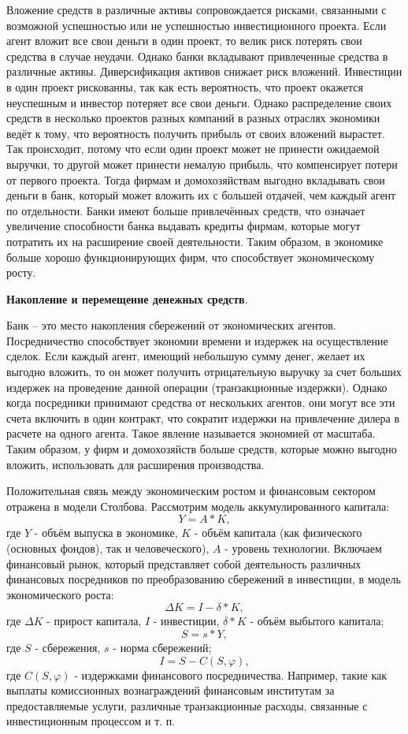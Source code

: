 \begin{Enumerate}
	Вложение средств в различные активы сопровождается рисками, связанными с возможной успешностью или не успешностью инвестиционного проекта. Если агент вложит все свои деньги в один проект, то велик риск потерять свои средства в случае неудачи. Однако банки вкладывают привлеченные средства в различные активы. Диверсификация активов снижает риск вложений. Инвестиции в один проект рискованны, так как есть вероятность, что проект окажется неуспешным и инвестор потеряет все свои деньги. Однако распределение своих средств в несколько проектов разных компаний в разных отраслях экономики ведёт к тому, что вероятность получить прибыль от своих вложений вырастет. Так происходит, потому что если один проект может не принести ожидаемой выручки, то другой может принести немалую прибыль, что компенсирует потери от первого проекта. Тогда фирмам и домохозяйствам выгодно вкладывать свои деньги в банк, который может вложить их с большей отдачей, чем каждый агент по отдельности. Банки имеют больше привлечённых средств, что означает увеличение способности банка выдавать кредиты фирмам, которые могут потратить их на расширение своей деятельности. Таким образом,  в экономике больше хорошо функционирующих фирм, что способствует экономическому росту.
	\item \textbf{Накопление и перемещение денежных средств}.
	
	Банк – это место накопления сбережений от экономических агентов. Посредничество способствует экономии времени и издержек на осуществление сделок.  Если каждый агент, имеющий небольшую сумму денег, желает их выгодно вложить, то он может получить отрицательную выручку за счет больших издержек на проведение данной операции (транзакционные издержки). Однако когда посредники принимают средства от нескольких агентов, они могут все эти счета включить в один контракт, что сократит издержки на привлечение дилера в расчете на одного агента. Такое явление называется экономией от масштаба. Таким образом, у фирм и домохозяйств больше средств, которые можно выгодно вложить, использовать для расширения производства.
\end{Enumerate}
\newcommand{\dl}{\Delta}
\newcommand{\s}{\delta}
\newcommand{\f}{\varphi}

Положительная связь между экономическим ростом и финансовым сектором отражена в модели Столбова. Рассмотрим модель аккумулированного капитала: \[Y=A*K, \tag{1}\label{1}\] где $Y$ - объём выпуска в экономике, $K$ - объём капитала (как физического (основных фондов), так и человеческого), $A$ - уровень технологии. Включаем финансовый рынок, который представляет собой деятельность различных финансовых посредников по преобразованию сбережений в инвестиции, в модель экономического роста: \[\dl K=I-\s*K, \tag{2}\label{2}\] где $\dl K$ - прирост капитала, $I$ - инвестиции, $\s*K$ - объём выбытого капитала; \[S=s*Y, \tag{3}\label{3}\] где $S$ - сбережения, $s$ - норма сбережений;\[I=S-C(S,\f), \tag{4}\label{4}\] где $C(S,\f)$ - издержками финансового посредничества. Например, такие как выплаты  комиссионных вознаграждений финансовым институтам за предоставляемые услуги, различные транзакционные расходы, связанные с инвестиционным процессом и т. п.

